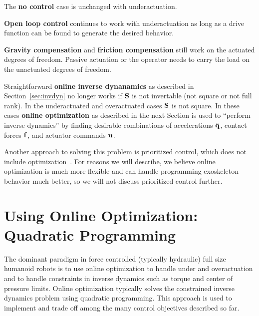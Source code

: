 \documentclass[letterpaper,12pt,fullpage]{article}
\begin{document}
The {\bf no control} case is unchanged with underactuation.

{\bf Open loop control} continues to work with underactuation
as long as a drive function can be found
to generate the desired behavior.

{\bf Gravity compensation} and {\bf friction compensation}
still work on the actuated degrees
of freedom. Passive actuation or 
the operator needs to carry the load on the unactuated degrees of freedom.

Straightforward {\bf online inverse dynanamics} as described in Section~\ref{sec:invdyn}
no longer works if ${\bf S}$ is not invertable (not square or not full rank).
In the underactuated and overactuated cases ${\bf S}$ is not square. 
In these cases {\bf online optimization}
as described in the next Section is used to ``perform inverse dynamics'' by
finding desirable combinations of accelerations $\ddot{{\bf q}}$, contact forces ${\bf f}$,
and actuator commands ${\bf u}$.

Another approach to solving this problem is prioritized control, which does
not include optimization~\cite{}. For reasons we will describe, we believe
online optimization is much more flexible and can handle programming exoskeleton
behavior much better, so we will not discuss prioritized control further.

\section{Using Online Optimization: Quadratic Programming}
\label{sec:qp}

The dominant paradigm in force controlled (typically
hydraulic) full size humanoid robots is to use online optimization
to handle under and overactuation
and to handle constraints in inverse dynamics
such as torque and center of pressure limits.
Online optimization typically solves the constrained inverse dynamics problem
using quadratic programming.
This approach is used
to implement and trade off among the many control objectives described so far.
\end{document}
